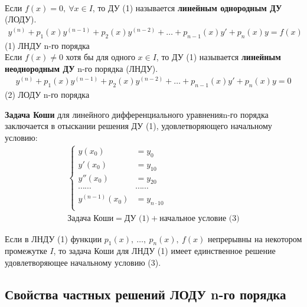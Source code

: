 \begin{definition}\ \\
    Если $f(x) = 0,\ \forall x \in I$, то ДУ (1) называется \textbf{линейным однородным ДУ} (ЛОДУ).
    \begin{align*}
        \boxed{y^{(n)} + p_1(x)y^{(n-1)}  + p_2(x)y^{(n-2)} + \ldots + p_{n-1}(x)y' + p_n(x)y = f(x)} \tag{1}
    \end{align*}
    (1) ЛНДУ n-го порядка \\[1ex]
    Если $f(x) \ne 0$ хотя бы для одного $x \in I$, то ДУ (1) называется \textbf{линейным неоднородным ДУ} n-го порядка (ЛНДУ). 
    \begin{gather}
        \boxed{y^{(n)} + p_1(x)y^{(n-1)}  + p_2(x)y^{(n-2)} + \ldots + p_{n-1}(x)y' + p_n(x)y = 0}
    \end{gather}
    (2) ЛОДУ n-го порядка
\end{definition}

\begin{definition}
    \textbf{Задача Коши} для линейного дифференциального уравнения\break n-го порядка заключается в отыскании решения ДУ (1), удовлетворяющего начальному условию:
    \begin{gather}
        \left\{ \begin{aligned}
            y(x_0) &= y_0 \\
            y'(x_0) &= y_{10} \\
            y''(x_0) &= y_{20} \\
            \cdots\cdots&\cdots\cdots \\
            y^{(n-1)}(x_0) &= y_{n\cdot10} \\
        \end{aligned} \right. \\
        \text{Задача Коши} = \text{ДУ (1)} + \text{начальное условие (3)}
    \end{gather}
\end{definition}

\newpage
\begin{theorem}
    Если в ЛНДУ (1) функции $p_1(x),\ \ldots,\ p_n(x),\ f(x)$ непрерывны на некотором промежутке $I$, то задача Коши для ЛНДУ (1) имеет единственное решение удовлетворяющее начальному условию (3).
\end{theorem}

\subsection*{Свойства частных решений ЛОДУ n-го порядка}

